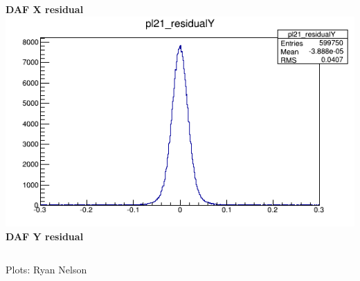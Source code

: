 \documentclass{beamer}
\begin{document}
\begin{frame}
\begin{columns}[t]
\tiny{\textbf{DAF X residual}} \\
\includegraphics[width=0.8\linewidth]{pics/DESYNOV13_DUT21_ResidualY.png}\\ 
\tiny{\textbf{DAF Y residual}} \\
\end{columns}
\tiny{Plots: Ryan Nelson}
\vspace{5pt}
\end{frame}
\end{document}
